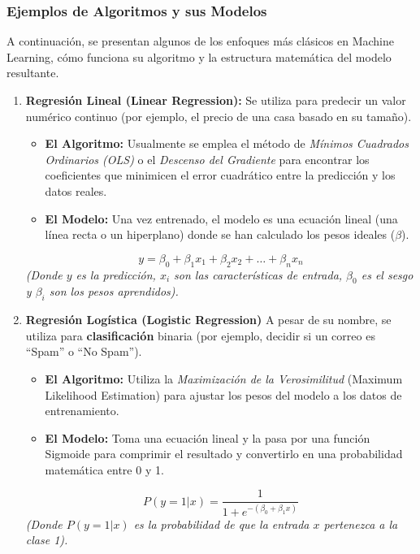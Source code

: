 \subsubsection{Ejemplos de Algoritmos y sus Modelos}

A continuación, se presentan algunos de los enfoques más clásicos en Machine Learning, cómo funciona su algoritmo y la estructura matemática del modelo resultante.

\begin{enumerate}
    \item {\bf Regresión Lineal (Linear Regression):} 
    Se utiliza para predecir un valor numérico continuo (por ejemplo, el precio de una casa basado en su tamaño).

    \begin{itemize}
        \item \textbf{El Algoritmo:} Usualmente se emplea el método de \textit{Mínimos Cuadrados Ordinarios (OLS)} o el \textit{Descenso del Gradiente} para encontrar los coeficientes que minimicen el error cuadrático entre la predicción y los datos reales.
        \item \textbf{El Modelo:} Una vez entrenado, el modelo es una ecuación lineal (una línea recta o un hiperplano) donde se han calculado los pesos ideales ($\beta$).
    \end{itemize}
    \begin{equation}
        y = \beta_0 + \beta_1 x_1 + \beta_2 x_2 + \dots + \beta_n x_n
    \end{equation}
    \textit{(Donde $y$ es la predicción, $x_i$ son las características de entrada, $\beta_0$ es el sesgo y $\beta_i$ son los pesos aprendidos).}
    \item {\bf Regresión Logística (Logistic Regression)}
A pesar de su nombre, se utiliza para \textbf{clasificación} binaria (por ejemplo, decidir si un correo es ``Spam'' o ``No Spam'').

\begin{itemize}
    \item \textbf{El Algoritmo:} Utiliza la \textit{Maximización de la Verosimilitud} (Maximum Likelihood Estimation) para ajustar los pesos del modelo a los datos de entrenamiento.
    \item \textbf{El Modelo:} Toma una ecuación lineal y la pasa por una función Sigmoide para comprimir el resultado y convertirlo en una probabilidad matemática entre 0 y 1.
\end{itemize}
\begin{equation}
    P(y=1|x) = \frac{1}{1 + e^{-(\beta_0 + \beta_1 x)}}
\end{equation}
\textit{(Donde $P(y=1|x)$ es la probabilidad de que la entrada $x$ pertenezca a la clase 1).}


\end{enumerate}
